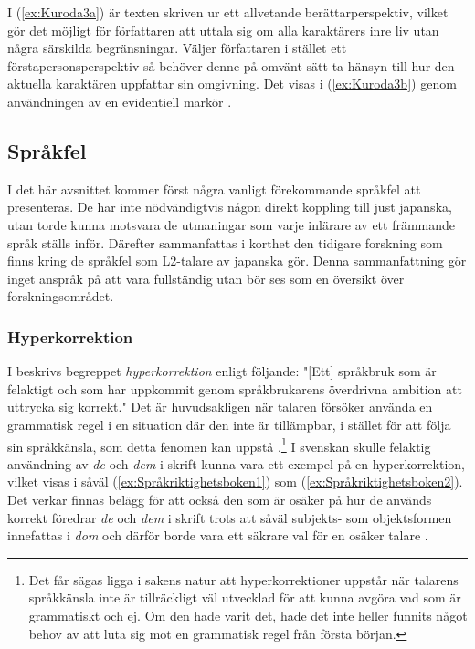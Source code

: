 \documentclass[12pt,a4paper]{article}
\begin{document}
\noindent
I (\ref{ex:Kuroda3a}) är texten skriven ur ett allvetande berättarperspektiv, vilket gör det möjligt för författaren att uttala sig om alla karaktärers inre liv utan några särskilda begränsningar. Väljer författaren i stället ett förstapersonsperspektiv så behöver denne på omvänt sätt ta hänsyn till hur den aktuella karaktären uppfattar sin omgivning. Det visas i (\ref{ex:Kuroda3b}) genom användningen av en evidentiell markör \autocite{kamio1995,kuroda1973}.

\subsection{Språkfel}
\label{sec:Bakgrund: Språkfel}
I det här avsnittet kommer först några vanligt förekommande språkfel att presenteras. De har inte nödvändigtvis någon direkt koppling till just japanska, utan torde kunna motsvara de utmaningar som varje inlärare av ett främmande språk ställs inför. Därefter sammanfattas i korthet den tidigare forskning som finns kring de språkfel som L2-talare av japanska gör. Denna sammanfattning gör inget anspråk på att vara fullständig utan bör ses som en översikt över forskningsområdet.

\subsubsection{Hyperkorrektion}
\label{subsec:Bakgrund: Språkfel: Hyperkorrektion}
I \textcite[390]{språkriktighetsboken2011} beskrivs begreppet \emph{hyperkorrektion} enligt följande: "[Ett] språkbruk som är felaktigt och som har uppkommit genom språkbrukarens överdrivna ambition att uttrycka sig korrekt." Det är huvudsakligen när talaren försöker använda en grammatisk regel i en situation där den inte är tillämpbar, i stället för att följa sin språkkänsla, som detta fenomen kan uppstå \autocite{menner1937}.\footnote{Det får sägas ligga i sakens natur att hyperkorrektioner uppstår när talarens språkkänsla inte är tillräckligt väl utvecklad för att kunna avgöra vad som är grammatiskt och ej. Om den hade varit det, hade det inte heller funnits något behov av att luta sig mot en grammatisk regel från första början.} I svenskan skulle felaktig användning av \emph{de} och \emph{dem} i skrift kunna vara ett exempel på en hyperkorrektion, vilket visas i såväl (\ref{ex:Språkriktighetsboken1}) som (\ref{ex:Språkriktighetsboken2}). Det verkar finnas belägg för att också den som är osäker på hur de används korrekt föredrar \emph{de} och \emph{dem} i skrift trots att såväl subjekts- som objektsformen innefattas i \emph{dom} och därför borde vara ett säkrare val för en osäker talare \autocite{språkriktighetsboken2011}.
\end{document}
